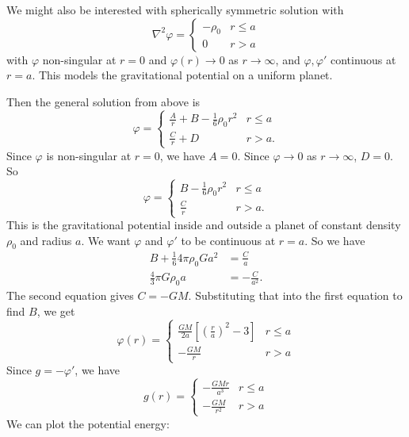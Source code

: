 \documentclass[a4paper]{article}
\begin{document}
\begin{eg}
  We might also be interested with spherically symmetric solution with
  \[
    \nabla^2 \varphi =
    \begin{cases}
      -\rho_0 & r \leq a\\
      0 & r > a
    \end{cases}
  \]
  with $\varphi$ non-singular at $r = 0$ and $\varphi(r) \to 0$ as $r\to \infty$, and $\varphi, \varphi'$ continuous at $r = a$. This models the gravitational potential on a uniform planet.

  Then the general solution from above is
  \[
    \varphi =
    \begin{cases}
      \frac{A}{r} + B - \frac{1}{6}\rho_0 r^2 & r \leq a\\
      \frac{C}{r} + D & r > a.
    \end{cases}
  \]
  Since $\varphi$ is non-singular at $r = 0$, we have $A = 0$. Since $\varphi \to 0$ as $r\to \infty$, $D = 0$. So
  \[
    \varphi =
    \begin{cases}
      B - \frac{1}{6}\rho_0 r^2 & r \leq a\\
      \frac{C}{r} & r > a.
    \end{cases}
  \]
  This is the gravitational potential inside and outside a planet of constant density $\rho_0$ and radius $a$.
  We want $\varphi$ and $\varphi'$ to be continuous at $r = a$. So we have
  \begin{align*}
    B + \frac{1}{6}4\pi \rho_0 Ga^2 &= \frac{C}{a}\\
    \frac{4}{3}\pi G\rho_0 a &= -\frac{C}{a^2}.
  \end{align*}
  The second equation gives $C = -GM$. Substituting that into the first equation to find $B$, we get
  \[
    \varphi (r) =
    \begin{cases}
      \frac{GM}{2a}\left[\left(\frac{r}{a}\right)^2 - 3\right] & r \leq a\\
      -\frac{GM}{r} & r > a
    \end{cases}
  \]
  Since $g = -\varphi'$, we have
  \[
    g(r) =
    \begin{cases}
      -\frac{GMr}{a^3}& r \leq a\\
      -\frac{GM}{r^2} & r > a
    \end{cases}
  \]
  We can plot the potential energy:
  \begin{center}
\end{center}
\end{eg}
\end{document}

